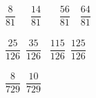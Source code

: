 \vspace{2em}



\noindent  
{}\ $ \dfrac{8}{81} $\quad\quad\  \ \ $ \dfrac{14}{81} $\qquad
\ \ \ $ \dfrac{56}{81} $\qquad \ \ $ \dfrac{64}{81} $
\\
\\
\ $ \dfrac{25}{126} $\qquad {}\ $ \dfrac{35}{126} $\qquad
{}\ $ \dfrac{115}{126} $\qquad {}\ $ \dfrac{125}{126} $ \\
\\
\ $ \dfrac{8}{729} $\qquad {}\ $ \dfrac{10}{729} $
